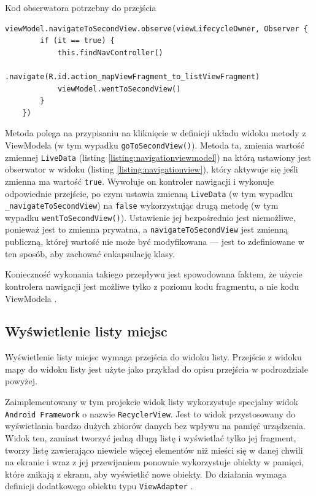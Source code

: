\documentclass[polish,polish,a4paper,12pt]{article}
\begin{document}
	\begin{listing}[H]
		\caption{Kod obserwatora potrzebny do przejścia}
		\begin{verbatim}
viewModel.navigateToSecondView.observe(viewLifecycleOwner, Observer {
		if (it == true) {
			this.findNavController()
				.navigate(R.id.action_mapViewFragment_to_listViewFragment)
			viewModel.wentToSecondView()
		}
	})
		\end{verbatim}
		\label{listing:navigationview}
	\end{listing}

	Metoda polega na przypisaniu na kliknięcie w definicji układu widoku metody z ViewModela (w tym wypadku \texttt{goToSecondView()}). Metoda ta, zmienia wartość zmiennej \texttt{LiveData} (listing \ref{listing:navigationviewmodel}) na którą ustawiony jest obserwator w widoku (listing \ref{listing:navigationview}), który aktywuje się jeśli zmienna ma wartość \texttt{true}. Wywołuje on kontroler nawigacji i wykonuje odpowiednie przejście, po czym ustawia zmienną \texttt{LiveData} (w tym wypadku \texttt{\_navigateToSecondView}) na \texttt{false} wykorzystując drugą metodę (w tym wypadku \texttt{wentToSecondView()}). Ustawienie jej bezpośrednio jest niemożliwe, ponieważ jest to zmienna prywatna, a \texttt{navigateToSecondView} jest zmienną publiczną, której wartość nie może być modyfikowana — jest to zdefiniowane w ten sposób, aby zachować enkapsulację klasy.

	Konieczność wykonania takiego przepływu jest spowodowana faktem, że użycie kontrolera nawigacji jest możliwe tylko z poziomu kodu fragmentu, a nie kodu ViewModela \cite{androidapi}.

	\subsection{Wyświetlenie listy miejsc}

	Wyświetlenie listy miejsc wymaga przejścia do widoku listy. Przejście z widoku mapy do widoku listy jest użyte jako przykład do opisu przejścia w podrozdziale powyżej.

	Zaimplementowany w tym projekcie widok listy wykorzystuje specjalny widok \texttt{Android Framework} o nazwie \texttt{RecyclerView}. Jest to widok przystosowany do wyświetlania bardzo dużych zbiorów danych bez wpływu na pamięć urządzenia. Widok ten, zamiast tworzyć jedną długą listę i wyświetlać tylko jej fragment, tworzy listę zawierająco niewiele więcej elementów niż mieści się w danej chwili na ekranie i wraz z jej przewijaniem ponownie wykorzystuje obiekty w pamięci, które znikają z ekranu, aby wyświetlić nowe obiekty. Do działania wymaga definicji dodatkowego obiektu typu \texttt{ViewAdapter} \cite{androidapi}.
\end{document}

